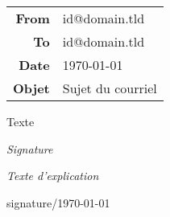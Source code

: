 \documentclass[14pt,parskip=half]{scrartcl}
\begin{document}
\noindent\begin{tabular}{>{\bfseries}r!{:}l}
	From	& id@domain.tld\\
	To		& id@domain.tld\\
	Date	& \today \\
	Objet	& Sujet du courriel
\end{tabular}
\par\vspace{1em}\noindent\hrulefill\vspace{2em}

Texte

\bigskip\hfill\emph{Signature}

\vfill{\tiny\itshape
	Texte d'explication
\par\hfill signature/\today}
\end{document}
